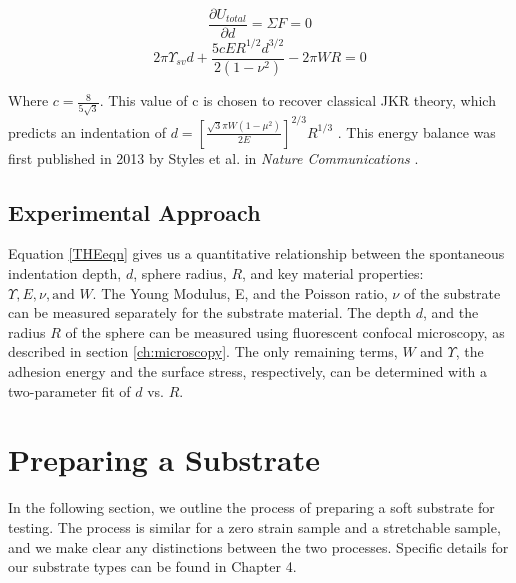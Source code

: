 \begin{equation*}
\frac{\partial U_{total}}{\partial d} = \Sigma F = 0
\end{equation*}
\begin{equation}
\label{THEeqn}
2 \pi \Upsilon_{sv}d  + \frac{5cER^{1/2}d^{3/2}}{2 \left( 1-\nu ^2 \right) }  - 2 \pi WR = 0
\end{equation}

Where $ c = \frac{8}{5\sqrt{3}} $. This value of c is chosen to recover classical JKR theory, which predicts an indentation of $ d =  \left[\frac{\sqrt{3}\pi W (1 - \mu^2)}{2E} \right]^{2/3}R^{1/3}$ \cite{style2013surface, johnson1971surface}. This energy balance was first published in 2013 by Styles et al. in \textit{Nature Communications} \cite{style2013surface}. 


\subsection{Experimental Approach}
Equation \ref{THEeqn} gives us a quantitative relationship between the spontaneous indentation depth, $ d $, sphere radius, $ R $, and key material properties: $ \Upsilon, E, \nu, \text{and }W $. The Young Modulus, E, and the Poisson ratio, $\nu$ of the substrate can be measured separately for the substrate material. The depth $d$, and the radius $R$ of the sphere can be measured using fluorescent confocal microscopy, as described in section \ref{ch:microscopy}. The only remaining terms, $W$ and $\Upsilon$, the adhesion energy and the surface stress, respectively, can be determined with a two-parameter fit of $ d $ vs. $ R. $

\section{Preparing a Substrate}
In the following section, we outline the process of preparing a soft substrate for testing. The process is similar for a zero strain sample and a stretchable sample, and we make clear any distinctions between the two processes. Specific details for our substrate types can be found in Chapter 4.

